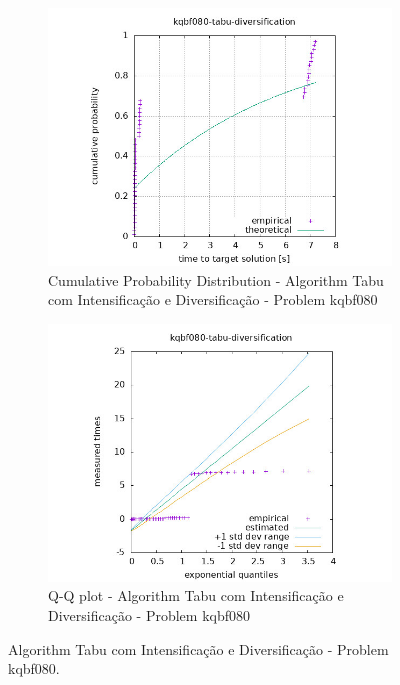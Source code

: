 \begin{figure}[H]
    \centering
    \begin{subfigure}{0.49\textwidth}
        \includegraphics[width=\textwidth]{figure/ttt_plot/kqbf080-tabu-diversification-exp.jpeg}
        \caption{Cumulative Probability Distribution - Algorithm Tabu com Intensificação e Diversificação - Problem kqbf080}
        \label{fig:tabu-com intensificação e diversificação-kqbf080-exp}
    \end{subfigure}
    \hfill
    \begin{subfigure}{0.49\textwidth}
        \includegraphics[width=\textwidth]{figure/ttt_plot/kqbf080-tabu-diversification-qq.jpeg}
        \caption{Q-Q plot - Algorithm Tabu com Intensificação e Diversificação - Problem kqbf080}
        \label{fig:tabu-com intensificação e diversificação-kqbf080-qq}
    \end{subfigure}
    \caption{Algorithm Tabu com Intensificação e Diversificação - Problem kqbf080.}
    \label{fig:tabu-com intensificação e diversificação-kqbf080}
\end{figure}
